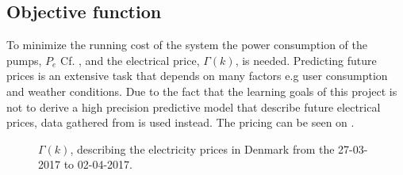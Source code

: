 \subsection{Objective function}\label{sec:cost_fkt} %
%
%
To minimize the running cost of the system the power consumption of the pumps, $P_e$ Cf. , and the electrical price, $\Gamma(k)$, is needed. Predicting future prices is an extensive task that depends on many factors e.g user consumption and weather conditions. Due to the fact that the learning goals of this project is not to derive a high precision predictive model that describe future electrical prices, data gathered from \cite{Electrical_price} is used instead. The pricing can be seen on . 





	


\begin{figure}[H]
\centering

\caption{$\Gamma(k)$, describing the electricity prices in Denmark from the 27-03-2017 to 02-04-2017.}
\label{fig:electrical_price} 
\end{figure}

